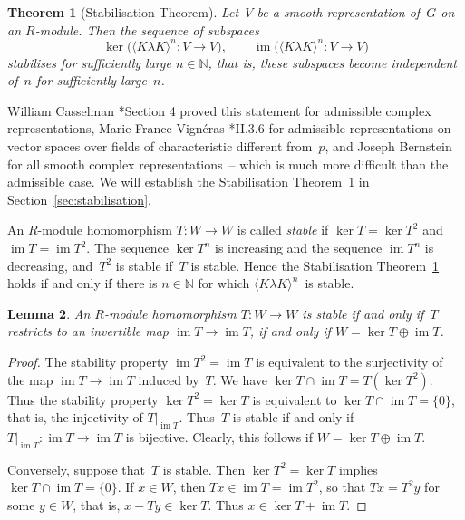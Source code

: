 \documentclass{amsart}
\newtheorem{theorem}{Theorem}[section]
\newtheorem{lem}[theorem]{Lemma}
\theoremstyle{remark}
\theoremstyle{definition}
\DeclareMathOperator{\im}{im}%
\newcommand*{\nb}{\nobreakdash}%
\newcommand*{\idem}[1]{\langle#1\rangle}%
\newcommand*{\N}{\mathbb N}%
\newcommand*{\Op}{T}%
\newcommand{\ring}{R}%
\begin{document}
\begin{theorem}[Stabilisation Theorem]
  \label{the:stabilisation_general}
  Let~\(V\) be a smooth representation of~\(G\) on an \(\ring\)\nb-module.  Then the sequence of subspaces
  \begin{equation}
    \label{eq:Jacquet_stability}
    \ker \bigl(\idem{K \lambda K}^n\colon V\to V\bigr),\qquad
    \im \bigl(\idem{K \lambda K}^n\colon V\to V\bigr)
  \end{equation}
  stabilises for sufficiently large \(n\in\N\), that is, these subspaces become independent of~\(n\) for sufficiently large~\(n\).
\end{theorem}

William Casselman \cite{Casselman:Representations_padic_groups}*{Section 4} proved this statement for admissible complex representations, Marie-France Vign\'eras \cite{Vigneras:l-modulaires}*{II.3.6} for admissible representations on vector spaces over fields of characteristic different from~\(p\), and Joseph Bernstein~\cite{Bernstein:Second_adjointness} for all smooth complex representations~-- which is much more difficult than the admissible case.  We will establish the Stabilisation Theorem~\ref{the:stabilisation_general} in Section~\ref{sec:stabilisation}.

An \(\ring\)\nb-module homomorphism \(\Op\colon W\to W\) is called \emph{stable} if \(\ker \Op = \ker \Op^2\) and \(\im \Op=\im \Op^2\).  The sequence \(\ker \Op^n\) is increasing and the sequence \(\im \Op^n\) is decreasing, and~\(\Op^2\) is stable if~\(\Op\) is stable.  Hence the Stabilisation Theorem~\ref{the:stabilisation_general} holds if and only if there is \(n\in\N\) for which \(\idem{K\lambda K}^n\)~is stable.

\begin{lem}
  \label{lem:stable_decomposition}
  An \(\ring\)\nb-module homomorphism \(\Op\colon W\to W\) is stable if and only if~\(\Op\) restricts to an invertible map \(\im \Op\to \im \Op\), if and only if \(W= \ker \Op \oplus \im \Op\).
\end{lem}

\begin{proof}
  The stability property \(\im \Op^2=\im \Op\) is equivalent to the surjectivity of the map \(\im \Op\to\im \Op\) induced by~\(\Op\).  We have \(\ker \Op\cap \im \Op = \Op(\ker \Op^2)\).  Thus the stability property \(\ker \Op^2=\ker \Op\) is equivalent to \(\ker \Op\cap \im \Op=\{0\}\), that is, the injectivity of \(\Op|_{\im \Op}\).  Thus~\(\Op\) is stable if and only if \(\Op|_{\im \Op} \colon \im \Op\to \im \Op\) is bijective.  Clearly, this follows if \(W=\ker \Op\oplus \im \Op\).

  Conversely, suppose that~\(\Op\) is stable.  Then \(\ker \Op^2=\ker \Op\) implies \(\ker \Op\cap \im \Op=\{0\}\).  If \(x\in W\), then \(\Op x\in \im \Op = \im \Op^2\), so that \(\Op x=\Op^2y\) for some \(y\in W\), that is, \(x-\Op y\in \ker \Op\).  Thus \(x\in \ker \Op +\im \Op\).
\end{proof}
\end{document}
